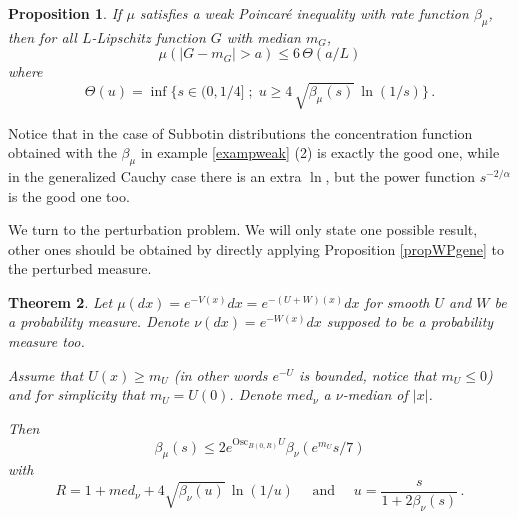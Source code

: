 \documentclass[11pt,reqno]{amsart}
\numberwithin{equation}{section}
\newtheorem{theorem}{Theorem}[section]
\newtheorem{proposition}[theorem]{Proposition}
\theoremstyle{definition}
\theoremstyle{remark}
\def \Osc {\textrm{Osc}}
\begin{document}
\begin{proposition}\label{propWPconcent}
If $\mu$ satisfies a weak Poincar\'e inequality with rate function $\beta_\mu$, then for all $L$-Lipschitz function $G$ with median $m_G$, $$\mu(|G-m_G|>a)\leq 6 \, \Theta(a/L)$$ where $$\Theta(u) = \inf\{s\in(0,1/4] \; ; \; u\geq 4 \, \sqrt{\beta_\mu(s)} \, \ln(1/s)\} \, .$$
\end{proposition}
Notice that in the case of Subbotin distributions the concentration function obtained with the $\beta_\mu$ in example \ref{exampweak} (2) is exactly the good one, while in the generalized Cauchy case there is an extra $\ln$, but the power function $s^{-2/\alpha}$ is the good one too.


We turn to the perturbation problem. We will only state one possible result, other ones should be obtained by directly applying Proposition \ref{propWPgene} to the perturbed measure.
\begin{theorem}\label{thmWPperturb}
Let $\mu(dx)= e^{-V(x)}dx=e^{-(U+W)(x)} dx$ for smooth $U$ and $W$ be a probability measure. Denote $\nu(dx)=e^{-W(x)}dx$ supposed to be a probability measure too. 

Assume that $U(x) \geq m_U$ (in other words $e^{-U}$ is bounded, notice that $m_U\leq 0$) and for simplicity that $m_U=U(0)$. Denote $med_\nu$ a $\nu$-median of $|x|$.

Then $$\beta_\mu(s) \leq 2 e^{\Osc_{B(0,R)} U} \beta_\nu(e^{m_U} s/7)$$  with $$R=1+med_\nu+4\sqrt{\beta_\nu(u)} \, \ln(1/u) \quad \textrm{ and } \quad u=\frac{s}{1+2\beta_\nu(s)} \, .$$
\end{theorem}
\end{document}
